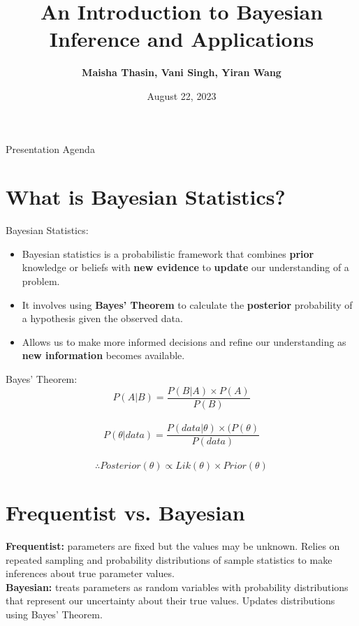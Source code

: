 \documentclass[dvipsnames,mathserif]{beamer}
\begin{document}
\rightskip\rightmargin
\title{An Introduction to Bayesian Inference and Applications}
\author{ \Large \textbf{ Maisha Thasin, Vani Singh, Yiran Wang} }
\footnotesize{\date{August 22, 2023 }


\begin{frame}
\maketitle
\end{frame}

\begin{frame}{Presentation Agenda}
\footnotesize \tableofcontents
\end{frame}

\section{What is Bayesian Statistics?}
\begin{frame}
\large Bayesian Statistics:
\begin{itemize}
    \item Bayesian statistics is a probabilistic framework that combines \textbf{prior} knowledge or beliefs with \textbf{new evidence} to \textbf{update} our understanding of a problem. 
    
    \item It involves using \textbf{Bayes' Theorem} to calculate the \textbf{posterior} probability of a hypothesis given the observed data.
   
    \item Allows us to make more informed decisions and refine our understanding as \textbf{new information} becomes available.
       
\end{itemize}
\end{frame}

\begin{frame}
\large Bayes' Theorem:
$$P(A|B)=\frac{P(B|A) \times P(A)}{P(B)}$$\\
$$P(\theta|data)=\frac{P(data|\theta)\times(P(\theta)}{P(data)}$$\\
$$\therefore Posterior(\theta) \propto Lik(\theta) \times Prior(\theta)$$
\end{frame}

\section{Frequentist vs. Bayesian}
\begin{frame}
\large \textbf{Frequentist:} parameters are fixed but the values may be unknown. Relies on repeated sampling and probability distributions of sample statistics to make inferences about true parameter values.\\
$$$$
\large \textbf{Bayesian:} treats parameters as random variables with probability distributions that represent our uncertainty about their true values. Updates distributions using Bayes' Theorem. 
\end{frame}

}
\end{document}
